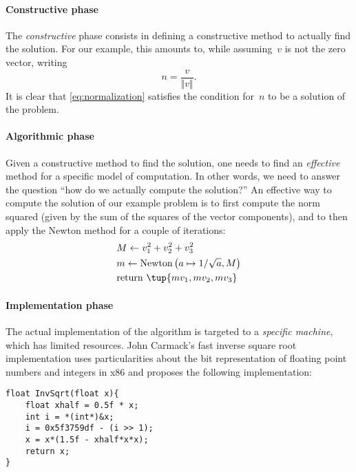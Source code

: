 \paragraph*{Constructive phase}
The \emph{constructive} phase consists in defining a constructive method to actually find the solution.
For our example, this amounts to, while assuming~$v$ is not the zero vector, writing
\begin{equation}
    \label{eq:normalization}
    n=\frac{v}{\Vert v \Vert}.
\end{equation}
It is clear that \cref{eq:normalization} satisfies the condition for~$n$ to be a solution of the problem.
\paragraph*{Algorithmic phase}
Given a constructive method to find the solution, one needs to find an \emph{effective} method for a specific model of computation.
In other words, we need to answer the question ``how do we actually compute the solution?''
An effective way to compute the solution of our example problem is to first compute the norm squared (given by the sum of the squares of the vector components), and to then apply the Newton method for a couple of iterations:
\begin{equation}
    \label{eq:newton_normalization}
    \begin{aligned}
        &M\leftarrow v_1^2+v_2^2+v_3^2\\
        &m\leftarrow \text{Newton}\left(a\mapsto 1/\sqrt{a},M\right)\\
        &\text{return }\tup{mv_1,mv_2,mv_3}
    \end{aligned}
\end{equation}

\paragraph*{Implementation phase}
The actual implementation of the algorithm is targeted to a \emph{specific machine}, which has limited resources.
John Carmack's fast inverse square root implementation uses particularities about the bit representation of floating point numbers and integers in x86 and proposes the following implementation:

\begin{center}
    \begin{verbatim}
float InvSqrt(float x){
    float xhalf = 0.5f * x;
    int i = *(int*)&x;
    i = 0x5f3759df - (i >> 1);
    x = x*(1.5f - xhalf*x*x);
    return x;
}
    \end{verbatim}
\end{center}

